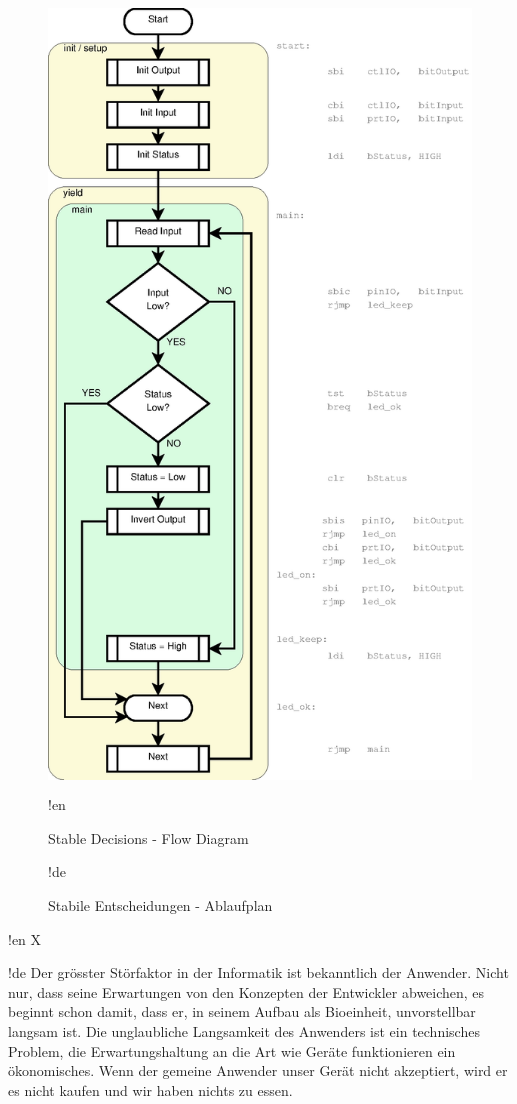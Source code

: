 \begin{figure}[htbp]
  \centering
  \includegraphics[height=210mm]{LED/S005_stable-decisions+symbols.eps}
!en   \caption{Stable Decisions - Flow Diagram}
!de   \caption{Stabile Entscheidungen - Ablaufplan}
  \label{S005FlowDiagam}
\end{figure}



!en X

!de Der grösster Störfaktor in der Informatik ist bekanntlich der Anwender. Nicht nur, dass seine Erwartungen von den Konzepten der Entwickler abweichen, es beginnt schon damit, dass er, in seinem Aufbau als Bioeinheit, unvorstellbar langsam ist. Die unglaubliche Langsamkeit des Anwenders ist ein technisches Problem, die Erwartungshaltung an die Art wie Geräte funktionieren ein ökonomisches. Wenn der gemeine Anwender unser Gerät nicht akzeptiert, wird er es nicht kaufen und wir haben nichts zu essen.



